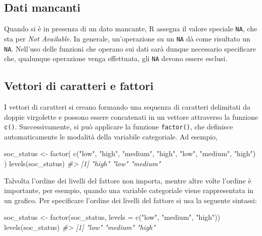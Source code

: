 \documentclass[
]{memoir}
\newenvironment{Shaded}{\begin{snugshade}}{\end{snugshade}}
\newcommand{\AttributeTok}[1]{\textcolor[rgb]{0.77,0.63,0.00}{#1}}
\newcommand{\CommentTok}[1]{\textcolor[rgb]{0.56,0.35,0.01}{\textit{#1}}}
\newcommand{\FunctionTok}[1]{\textcolor[rgb]{0.00,0.00,0.00}{#1}}
\newcommand{\NormalTok}[1]{#1}
\newcommand{\OtherTok}[1]{\textcolor[rgb]{0.56,0.35,0.01}{#1}}
\newcommand{\StringTok}[1]{\textcolor[rgb]{0.31,0.60,0.02}{#1}}
\theoremstyle{definition}
\theoremstyle{definition}
\theoremstyle{definition}
\theoremstyle{definition}
\theoremstyle{remark}
\begin{document}
\hypertarget{dati-mancanti}{%
\subsection{Dati mancanti}\label{dati-mancanti}}

Quando si è in presenza di un dato mancante, R assegna il valore
speciale \texttt{NA}, che sta per \emph{Not Available}. In generale, un'operazione
su un \texttt{NA} dà come risultato un \texttt{NA}. Nell'uso delle funzioni che
operano sui dati sarà dunque necessario specificare che, qualunque
operazione venga effettuata, gli \texttt{NA} devono essere esclusi.

\hypertarget{vettori-di-caratteri-e-fattori}{%
\subsection{Vettori di caratteri e fattori}\label{vettori-di-caratteri-e-fattori}}

I vettori di caratteri si creano formando una sequenza di caratteri
delimitati da doppie virgolette e possono essere concatenati in un
vettore attraverso la funzione \texttt{c()}. Successivamente, si può applicare
la funzione \texttt{factor()}, che definisce automaticamente le modalità della
variabile categoriale. Ad esempio,

\begin{Shaded}
\begin{Highlighting}[]
\NormalTok{soc\_status }\OtherTok{\textless{}{-}} \FunctionTok{factor}\NormalTok{(}
  \FunctionTok{c}\NormalTok{(}\StringTok{"low"}\NormalTok{, }\StringTok{"high"}\NormalTok{, }\StringTok{"medium"}\NormalTok{, }\StringTok{"high"}\NormalTok{, }\StringTok{"low"}\NormalTok{, }\StringTok{"medium"}\NormalTok{, }\StringTok{"high"}\NormalTok{)}
\NormalTok{)}
\FunctionTok{levels}\NormalTok{(soc\_status)}
\CommentTok{\#\textgreater{} [1] "high"   "low"    "medium"}
\end{Highlighting}
\end{Shaded}

Talvolta l'ordine dei livelli del fattore non importa, mentre altre
volte l'ordine è importante, per esempio, quando una variable
categoriale viene rappresentata in un grafico. Per specificare l'ordine
dei livelli del fattore si usa la seguente sintassi:

\begin{Shaded}
\begin{Highlighting}[]
\NormalTok{soc\_status }\OtherTok{\textless{}{-}}
  \FunctionTok{factor}\NormalTok{(soc\_status, }\AttributeTok{levels =} \FunctionTok{c}\NormalTok{(}\StringTok{"low"}\NormalTok{, }\StringTok{"medium"}\NormalTok{, }\StringTok{"high"}\NormalTok{))}
\FunctionTok{levels}\NormalTok{(soc\_status)}
\CommentTok{\#\textgreater{} [1] "low"    "medium" "high"}
\end{Highlighting}
\end{Shaded}
\end{document}

